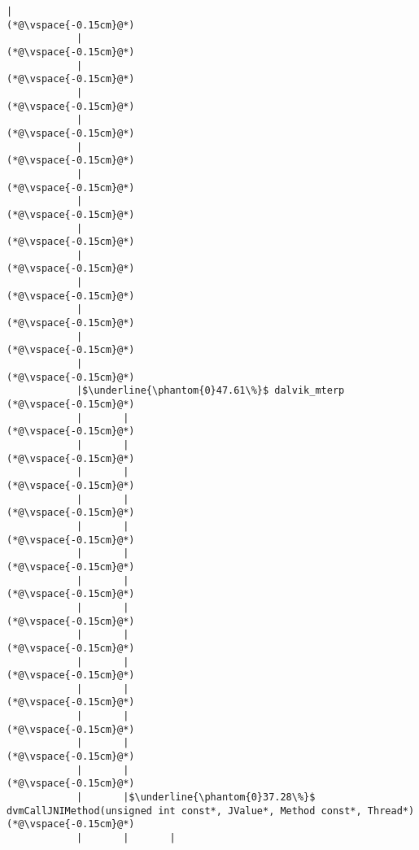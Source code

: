 \begin{lstlisting}[caption=Staattinen metodi Java$\to$C , label=profile:J2CBenchmark00001, numberbychapter=true, frame=lines, float, floatplacement=t]
            |
(*@\vspace{-0.15cm}@*)
            |
(*@\vspace{-0.15cm}@*)
            |
(*@\vspace{-0.15cm}@*)
            |
(*@\vspace{-0.15cm}@*)
            |
(*@\vspace{-0.15cm}@*)
            |
(*@\vspace{-0.15cm}@*)
            |
(*@\vspace{-0.15cm}@*)
            |
(*@\vspace{-0.15cm}@*)
            |
(*@\vspace{-0.15cm}@*)
            |
(*@\vspace{-0.15cm}@*)
            |
(*@\vspace{-0.15cm}@*)
            |
(*@\vspace{-0.15cm}@*)
            |
(*@\vspace{-0.15cm}@*)
            |
(*@\vspace{-0.15cm}@*)
            |$\underline{\phantom{0}47.61\%}$ dalvik_mterp
(*@\vspace{-0.15cm}@*)
            |       |
(*@\vspace{-0.15cm}@*)
            |       |
(*@\vspace{-0.15cm}@*)
            |       |
(*@\vspace{-0.15cm}@*)
            |       |
(*@\vspace{-0.15cm}@*)
            |       |
(*@\vspace{-0.15cm}@*)
            |       |
(*@\vspace{-0.15cm}@*)
            |       |
(*@\vspace{-0.15cm}@*)
            |       |
(*@\vspace{-0.15cm}@*)
            |       |
(*@\vspace{-0.15cm}@*)
            |       |
(*@\vspace{-0.15cm}@*)
            |       |
(*@\vspace{-0.15cm}@*)
            |       |
(*@\vspace{-0.15cm}@*)
            |       |
(*@\vspace{-0.15cm}@*)
            |       |
(*@\vspace{-0.15cm}@*)
            |       |$\underline{\phantom{0}37.28\%}$ dvmCallJNIMethod(unsigned int const*, JValue*, Method const*, Thread*)
(*@\vspace{-0.15cm}@*)
            |       |       |

\end{lstlisting}
